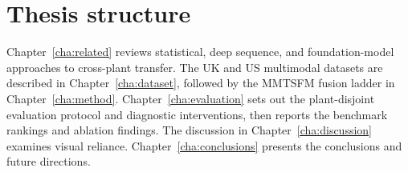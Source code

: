 \section{Thesis structure}

Chapter~\ref{cha:related} reviews statistical, deep sequence, and foundation-model approaches to cross-plant transfer. The UK and US multimodal datasets are described in Chapter~\ref{cha:dataset}, followed by the MMTSFM fusion ladder in Chapter~\ref{cha:method}. Chapter~\ref{cha:evaluation} sets out the plant-disjoint evaluation protocol and diagnostic interventions, then reports the benchmark rankings and ablation findings. The discussion in Chapter~\ref{cha:discussion} examines visual reliance. Chapter~\ref{cha:conclusions} presents the conclusions and future directions.
